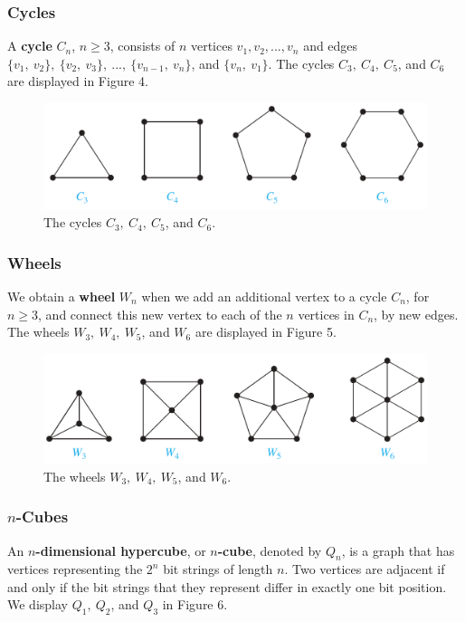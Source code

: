 \documentclass[11pt]{article}
\begin{document}
\subsubsection{Cycles}

A \textbf{cycle} $C_n$, $n \geq 3$, consists of $n$ vertices $v_1, v_2, ..., v_n$ and edges $\{v_1,\ v_2\},\ \{v_2,\ v_3\},\ ...,\ \{v_{n-1},\ v_n\}$, and $\{v_n,\ v_1\}$. The cycles $C_3,\ C_4,\ C_5$, and $C_6$ are displayed in Figure 4.

\begin{figure}[h!]
    \centering
    \includegraphics[width=.75\textwidth]{img/ch10.2-figure4.png}
    \caption{The cycles $C_3,\ C_4,\ C_5$, and $C_6$.}
    \label{fig:my_label}
\end{figure}

\subsubsection{Wheels}

We obtain a \textbf{wheel} $W_n$ when we add an additional vertex to a cycle $C_n$, for $n \geq 3$, and connect this new vertex to each of the $n$ vertices in $C_n$, by new edges. The wheels $W_3,\ W_4,\ W_5$, and $W_6$ are displayed in Figure 5.

\begin{figure}[h!]
    \centering
    \includegraphics[width=.75\textwidth]{img/ch10.2-figure5.png}
    \caption{The wheels $W_3,\ W_4,\ W_5$, and $W_6$.}
    \label{fig:my_label}
\end{figure}

\subsubsection{$n$-Cubes}

An \textbf{$n$-dimensional hypercube}, or \textbf{$n$-cube}, denoted by $Q_n$, is a graph that has vertices representing the $2^n$ bit strings of length $n$. Two vertices are adjacent if and only if the bit strings that they represent differ in exactly one bit position. We display $Q_1,\ Q_2$, and $Q_3$ in Figure 6.
\end{document}
